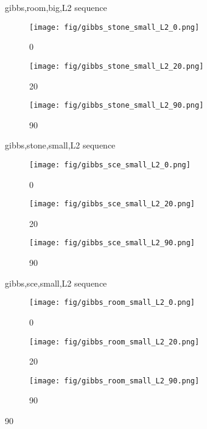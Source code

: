 \begin{figure}
  \caption{gibbs,room,big,L2 sequence}
  \label{fig:three_images}
\end{figure}\begin{figure} 
    \centering
    \begin{subfigure}[b]{0.3\textwidth}
    \texttt{[image: fig/gibbs\_stone\_small\_L2\_0.png]}
    \caption{0}
    \label{fig:image1}
  \end{subfigure}
  \hfill
  \begin{subfigure}[b]{0.3\textwidth}
    \texttt{[image: fig/gibbs\_stone\_small\_L2\_20.png]}
    \caption{20}
    \label{fig:image2}
  \end{subfigure}
  \hfill
  \begin{subfigure}[b]{0.3\textwidth}
    \texttt{[image: fig/gibbs\_stone\_small\_L2\_90.png]}
    \caption{90}
    \label{fig:image3}
  \end{subfigure}

  \caption{gibbs,stone,small,L2 sequence}
  \label{fig:three_images}
\end{figure}\begin{figure} 
    \centering
    \begin{subfigure}[b]{0.3\textwidth}
    \texttt{[image: fig/gibbs\_sce\_small\_L2\_0.png]}
    \caption{0}
    \label{fig:image1}
  \end{subfigure}
  \hfill
  \begin{subfigure}[b]{0.3\textwidth}
    \texttt{[image: fig/gibbs\_sce\_small\_L2\_20.png]}
    \caption{20}
    \label{fig:image2}
  \end{subfigure}
  \hfill
  \begin{subfigure}[b]{0.3\textwidth}
    \texttt{[image: fig/gibbs\_sce\_small\_L2\_90.png]}
    \caption{90}
    \label{fig:image3}
  \end{subfigure}

  \caption{gibbs,sce,small,L2 sequence}
  \label{fig:three_images}
\end{figure}\begin{figure} 
    \centering
    \begin{subfigure}[b]{0.3\textwidth}
    \texttt{[image: fig/gibbs\_room\_small\_L2\_0.png]}
    \caption{0}
    \label{fig:image1}
  \end{subfigure}
  \hfill
  \begin{subfigure}[b]{0.3\textwidth}
    \texttt{[image: fig/gibbs\_room\_small\_L2\_20.png]}
    \caption{20}
    \label{fig:image2}
  \end{subfigure}
  \hfill
  \begin{subfigure}[b]{0.3\textwidth}
    \texttt{[image: fig/gibbs\_room\_small\_L2\_90.png]}
    \caption{90}
    \label{fig:image3}
  \end{subfigure}


\end{figure}
